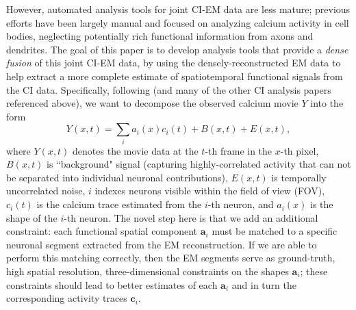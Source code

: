 \documentclass[10pt,letterpaper]{article}
\begin{document}
However, automated analysis tools for joint CI-EM data are less mature; previous efforts have been largely manual and focused on analyzing calcium activity in cell bodies, neglecting potentially rich functional information from axons and dendrites.  
The goal of this paper is to develop analysis tools that provide a \emph{dense fusion} of this joint CI-EM data, by using the densely-reconstructed EM data to help extract a more complete estimate of spatiotemporal functional signals from the CI data.  Specifically, following \citep{Pnevmatikakis2016} (and many of the other CI analysis papers referenced above), we want to decompose the observed calcium movie $Y$ into the form 
$$Y(x,t)=\sum_i a_i(x) c_i(t) + B(x,t) + E(x,t),$$
where $Y(x,t)$ denotes the movie data at the $t$-th frame in the $x$-th pixel, $B(x,t)$ is ``background" signal (capturing highly-correlated activity that can not be separated into individual neuronal contributions), $E(x,t)$ is temporally uncorrelated noise, $i$ indexes neurons visible within the field of view (FOV), $c_i(t)$ is the calcium trace estimated from the $i$-th neuron, and $a_i(x)$ is the shape of the $i$-th neuron.  The novel step here is that we add an additional constraint: each functional spatial component $\bm{a}_i$ must be matched to a specific neuronal segment extracted from the EM reconstruction.  If we are able to perform this matching correctly, then the EM segments serve as ground-truth, high spatial resolution, three-dimensional constraints on the shapes $\bm{a}_i$; these constraints should lead to better estimates of each $\bm{a}_i$ and in turn the corresponding activity traces $\bm{c}_i$.

\end{document}
